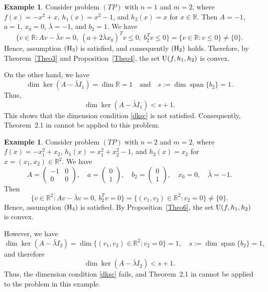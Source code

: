 \documentclass[]{interact}
\theoremstyle{plain}%
\theoremstyle{definition}
\newtheorem{example}[theorem]{Example}
\theoremstyle{remark}
\begin{document}
	\begin{example}\label{ex1}
		Consider  problem $(TP)$ with $n=1$ and $m=2$, where
		$f(x)=-x^2+x$, $h_1(x)=x^2-1$, and $h_2(x)=x$ for $x\in\mathbb{R}$.
		Then $A=-1$, $a=1$, $x_0=0$, $\bar\lambda=-1$, and $b_2=1$.
		We have
		\[
		\{v\in\mathbb{R}: Av-\bar\lambda v=0,\ (a+2\bar\lambda x_0)^Tv\le0,\ b_2^Tv\le0\}
		=\{v\in\mathbb{R}: v\le0\}\neq\{0\}.
		\]
		Hence, assumption ${\rm (H_3)}$ is satisfied, and consequently ${\rm (H_2)}$ holds.
		Therefore, by Theorem~\ref{Theo3} and Proposition~\ref{Theo4}, the set
		${\rm U}(f,h_1,h_2)$ is convex.
		
		On the other hand, we have
		\[
		\dim \ker(A-\bar\lambda I_1)=\dim \mathbb{R}=1
		\quad\text{and}\quad
		s:=\dim \operatorname{span}\{b_2\}=1.
		\]
		Thus,
		\[
		\dim \ker(A-\bar\lambda I_1)< s+1.
		\]
		This shows that the dimension condition \eqref{dksc} is not satisfied.
		Consequently, Theorem~2.1 in \cite{JeyakumarLi2014} cannot be applied to this problem.
	\end{example}
	
	\begin{example}\label{ex2}
		Consider problem $(TP)$ with $n=2$ and $m=2$, where
		$f(x)=-x_1^2+x_2$, $h_1(x)=x_1^2+x_2^2-1$, and $h_2(x)=x_2$ for
		$x=(x_1,x_2)\in\mathbb{R}^2$.
		We have
		\[
		A=\begin{pmatrix}
			-1 & 0\\
			0 & 0
		\end{pmatrix},\quad
		a=\begin{pmatrix}
			0\\
			1
		\end{pmatrix},\quad
		b_2=\begin{pmatrix}
			0\\
			1
		\end{pmatrix},\quad
		x_0=0,\quad
		\bar\lambda=-1.
		\]
		Then
		\[
		\{v\in\mathbb{R}^2: Av-\bar\lambda v=0,\ b_2^Tv=0\}
		=\{(v_1,v_2)\in\mathbb{R}^2: v_2=0\}\neq\{0\}.
		\]
		Hence, assumption ${\rm (H_4)}$ is satisfied.
		By Proposition~\ref{Theo6}, the set ${\rm U}(f,h_1,h_2)$ is convex.
		
		However, we have
		\[
		\dim \ker(A-\bar\lambda I_2)
		=\dim\{(v_1,v_2)\in\mathbb{R}^2: v_2=0\}=1,
		\quad
		s:=\dim \operatorname{span}\{b_2\}=1,
		\]
		and therefore
		\[
		\dim \ker(A-\bar\lambda I_2)< s+1.
		\]
		Thus, the dimension condition \eqref{dksc} fails, and Theorem~2.1 in
		\cite{JeyakumarLi2014} cannot be applied to the problem in this example.
	\end{example}
	
\end{document}
